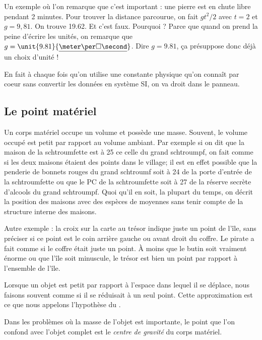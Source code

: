 \begin{exemple}
Un exemple où l'on remarque que c'est important : une pierre est en chute libre pendant 2 minutes. Pour trouver la distance parcourue, on fait $gt^2/2$ avec $t=2$ et $g=9,81$. On trouve 19.62. Et c'est faux. Pourquoi ? Parce que quand on prend la peine d'écrire les unités, on remarque que $g=\unit{9.81}{\underline{\meter\per\square\second}}$. Dire \og $g=9.81$\fg, ça présuppose donc déjà un choix d'unité !

En fait à chaque fois qu'on utilise une constante physique \og qu'on connaît par coeur\fg{} sans convertir les données en système SI, on va droit dans le panneau.
\end{exemple}

\subsection{Le point matériel}


Un corps matériel occupe un volume et possède une masse. Souvent, le volume occupé est petit par rapport au volume ambiant. Par exemple si on dit que la maison de la schtroumfette est à \unit{25}{\meter} ce celle du grand schtroumpf, on fait \og comme si\fg{} les deux maisons étaient des points dans le village; il est en effet possible que la penderie de bonnets rouges du grand schtroumf soit à \unit{24}{\meter} de la porte d'entrée de la schtroumfette ou que le PC de la schtroumfette soit à \unit{27}{\meter} de la réserve secrète d'alcools du grand schtroumpf. Quoi qu'il en soit, la plupart du temps,  on décrit la position des maisons avec des espèces de moyennes sans tenir compte de la structure interne des maisons.

Autre exemple : la croix sur la carte au trésor indique juste un point de l'île, sans préciser si ce point est le coin arrière gauche ou avant droit du coffre. Le pirate a fait comme si le coffre était juste un point. À moins que le butin soit vraiment énorme ou que l'île soit minuscule, le trésor est bien un point par rapport à l'ensemble de l'île.

\begin{definition}
Lorsque un objet est petit par rapport à l'espace dans lequel il se déplace, nous faisons souvent comme si il se réduisait à un seul point. Cette approximation est ce que nous appelons l'hypothèse du . 
\end{definition}

Dans les problèmes où la masse de l'objet est importante, le point que l'on confond avec l'objet complet est le \emph{centre de gravité} du corps matériel.


